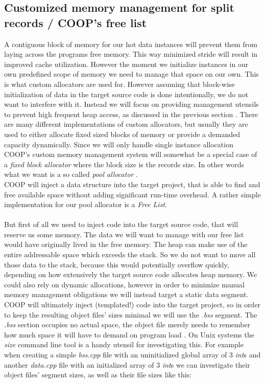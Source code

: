 \subsection{Customized memory management for split records / COOP's free list}\label{memory_management}
A contiguous block of memory for our hot data instances will prevent them from laying across the programs free memory. This way minimized stride will result in improved cache utilization. However the moment we initialize instances in our own predefined scope of memory we need to manage that space on our own. This is what custom allocators are used for.
However assuming that block-wise initialization of data in the target source code is done intentionally, we do not want to interfere with it. Instead we will focus on providing management utensils to prevent high frequent heap access, as discussed in the previous section . There are many different implementations of custom allocators, but usually they are used to either allocate fixed sized blocks of memory or provide a demanded capacity dynamically. Since we will only handle single instance allocation COOP's custom memory management system will somewhat be a special case of a \textit{fixed block allocator} where the block size is the records size. In other words what we want is a so called \textit{pool allocator} .\\
COOP will inject a data structure into the target project, that is able to find and free available space without adding significant run-time overhead. A rather simple implementation for our pool allocator is a \textit{Free List}.\\\\
But first of all we need to inject code into the target source code, that will reserve us some memory. The data we will want to manage with our free list would have originally lived in the free memory. The heap can make use of the entire addressable space which exceeds the stack. So we do not want to move all those data to the stack, because this would potentially overflow quickly, depending on how extensively the target source code allocates heap memory. We could also rely on dynamic allocations, however in order to minimize manual memory management obligations we will instead target a static data segment. COOP will ultimately inject (templated!) code into the target project, so in order to keep the resulting object files' sizes minimal we will use the \textit{.bss} segment. The \textit{.bss} section occupies no actual space, the object file merely needs to remember how much space it will have to demand on program load . On Unix systems the \textit{size} command line tool is a handy utensil for investigating this. For example when creating a simple \textit{bss.cpp} file with an uninitialized global array of 3 \textit{int}s and another \textit{data.cpp} file with an initialized array of 3 \textit{int}s we can investigate their object files' segment sizes, as well as their file sizes like this: 
